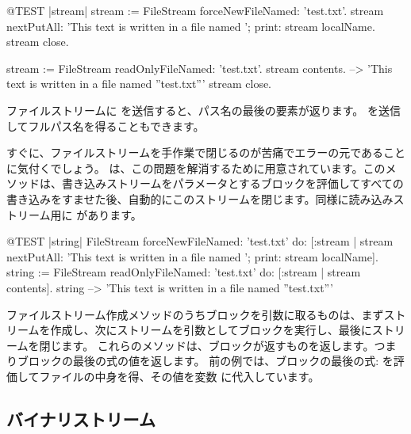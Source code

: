 \documentclass[a4paper,10pt,twoside]{book}
\begin{document}
\begin{code}{@TEST |stream|}
stream := FileStream forceNewFileNamed: 'test.txt'.
stream
    nextPutAll: 'This text is written in a file named ';
    print: stream localName.
stream close.

stream := FileStream readOnlyFileNamed: 'test.txt'.
stream contents. --> 'This text is written in a file named ''test.txt'''
stream close.
\end{code}



ファイルストリームに  を送信すると、パス名の最後の要素が返ります。
 を送信してフルパス名を得ることもできます。

すぐに、ファイルストリームを手作業で閉じるのが苦痛でエラーの元であることに気付くでしょう。
 は、この問題を解消するために用意されています。このメソッドは、書き込みストリームをパラメータとするブロックを評価してすべての書き込みをすませた後、自動的にこのストリームを閉じます。同様に読み込みストリーム用に  があります。%

\begin{code}{@TEST |string|}
FileStream
    forceNewFileNamed: 'test.txt'
    do: [:stream |
        stream
            nextPutAll: 'This text is written in a file named ';
            print: stream localName].
string := FileStream
            readOnlyFileNamed: 'test.txt'
            do: [:stream | stream contents].
string --> 'This text is written in a file named ''test.txt'''
\end{code}

ファイルストリーム作成メソッドのうちブロックを引数に取るものは、まずストリームを作成し、次にストリームを引数としてブロックを実行し、最後にストリームを閉じます。
これらのメソッドは、ブロックが返すものを返します。つまりブロックの最後の式の値を返します。
前の例では、ブロックの最後の式:  を評価してファイルの中身を得、その値を変数  に代入しています。

\subsection{バイナリストリーム}
\end{document}
